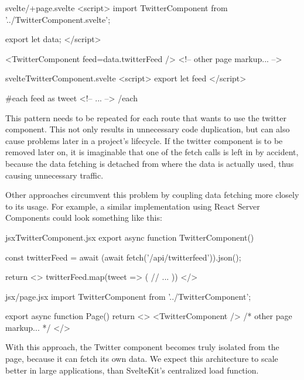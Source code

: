 \begin{myminted}{svelte}{/+page.svelte}
<script>
    import TwitterComponent from '../TwitterComponent.svelte';

    export let data;
</script>

<TwitterComponent feed={data.twitterFeed} />
<!-- other page markup... -->
\end{myminted}

\begin{myminted}{svelte}{TwitterComponent.svelte}
<script>
    export let feed
</script>

{#each feed as tweet}
    <!-- ... -->
{/each}
\end{myminted}

This pattern needs to be repeated for each route that wants to use the twitter component. This not only results in unnecessary code duplication, but can also cause problems later in a project's lifecycle. If the twitter component is to be removed later on, it is imaginable that one of the fetch calls is left in by accident, because the data fetching is detached from where the data is actually used, thus causing unnecessary traffic.

Other approaches circumvent this problem by coupling data fetching more closely to its usage. For example, a similar implementation using React Server Components could look something like this:

\begin{myminted}{jsx}{TwitterComponent.jsx}
export async function TwitterComponent() {
    const twitterFeed = await (await fetch('/api/twitterfeed')).json();

    return <>
        {twitterFeed.map(tweet => (
            // ...
        ))}
    </>
}
\end{myminted}

\begin{myminted}{jsx}{/page.jsx}
import TwitterComponent from '../TwitterComponent';

export async function Page() {
    return <>
        <TwitterComponent />
        { /* other page markup... */ }
    </>
}
\end{myminted}

With this approach, the Twitter component becomes truly isolated from the page, because it can fetch its own data. We expect this architecture to scale better in large applications, than SvelteKit's centralized load function.


